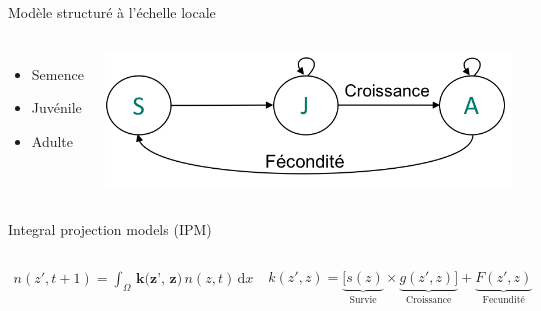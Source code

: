 \documentclass[11pt, compress, aspectratio=1610]{beamer}
\newcommand{\begincols}{\begin{columns}}
\newcommand{\stopcols}{\end{columns}}
\begin{document}
\begin{frame}{Modèle structuré à l’échelle locale}
\protect\hypertarget{moduxe8le-structuruxe9-uxe0-luxe9chelle-locale}{}

\begincols
{}
  \begin{itemize}
    \item
      {\color{plST}S}emence
    \item
      {\color{plST}J}uvénile
    \item
      {\color{plST}A}dulte
  \end{itemize}

\hfill{}
  \centering

\includegraphics[scale=0.65]{figures/cycle}

\par
\stopcols

\end{frame}

\begin{frame}{Integral projection models (IPM)}
\protect\hypertarget{integral-projection-models-ipm}{}

\begincols
{}

\begin{align*}
    n(z', t + 1) = \int_{\Omega} \, \textbf{k(z', z)}\, n(z, t)\, \mathrm{d}x
  \end{align*}

\begin{align*}
    k(z', z) = \underbrace{[s(z)}_\text{Survie}\times\underbrace{g(z', z)]}_\text{Croissance} + \underbrace{F(z', z)}_\text{Fecundité}
  \end{align*}

\hfill{}
 \centering

\includegraphics[scale=0.6]{figures/cycle_cont}

\par
\stopcols

\end{frame}
\end{document}

